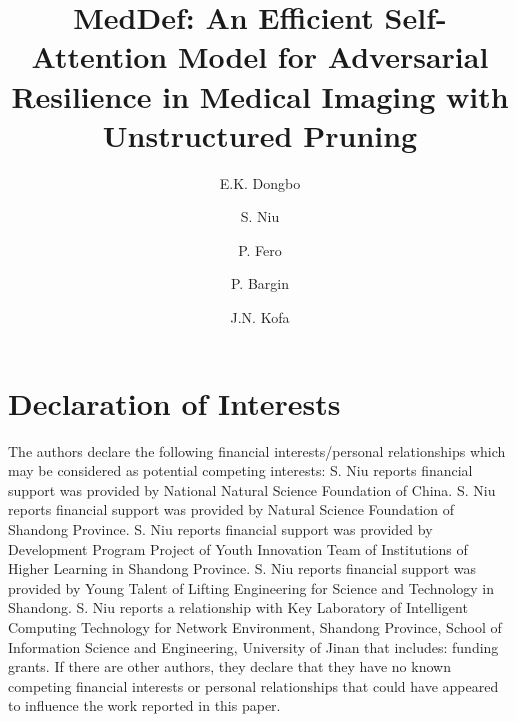 \documentclass[preprint,12pt]{elsarticle}
\begin{document}
\begin{frontmatter}

\title{MedDef: An Efficient Self-Attention Model for Adversarial Resilience in Medical Imaging with Unstructured Pruning}

\author[a]{E.K. Dongbo}
\author[a]{S. Niu}
\author[b]{P. Fero}
\author[b]{P. Bargin}
\author[c]{J.N. Kofa}





\end{frontmatter}

\section*{Declaration of Interests}
The authors declare the following financial interests/personal relationships which may be considered as potential competing interests: S. Niu reports financial support was provided by National Natural Science Foundation of China. S. Niu reports financial support was provided by Natural Science Foundation of Shandong Province. S. Niu reports financial support was provided by Development Program Project of Youth Innovation Team of Institutions of Higher Learning in Shandong Province. S. Niu reports financial support was provided by Young Talent of Lifting Engineering for Science and Technology in Shandong. S. Niu reports a relationship with Key Laboratory of Intelligent Computing Technology for Network Environment, Shandong Province, School of Information Science and Engineering, University of Jinan that includes: funding grants. If there are other authors, they declare that they have no known competing financial interests or personal relationships that could have appeared to influence the work reported in this paper.
\end{document}
